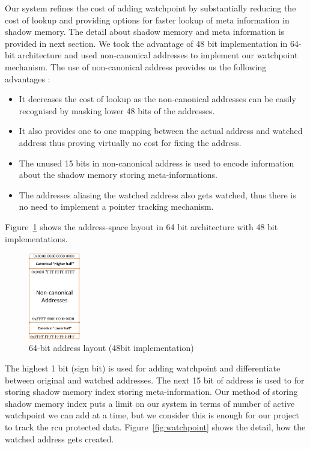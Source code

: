 Our system refines the cost of adding watchpoint by substantially reducing the cost of lookup and providing options for faster lookup of meta information in shadow memory. The detail about shadow memory and meta information is provided in next section. We took the advantage of 48 bit implementation in 64-bit architecture and used non-canonical addresses to implement our watchpoint mechanism. The use of non-canonical address provides us the following advantages :
\begin{itemize}
	\item It decreases the cost of lookup as the non-canonical addresses can be easily recognised by masking lower 48 bits of the addresses.
	\item It also provides one to one mapping between the actual address and watched address thus proving virtually no cost for fixing the address.
	\item The unused 15 bits in non-canonical address is used to encode information about the shadow memory storing meta-informations.
	\item The addresses aliasing the watched address also gets watched, thus there is no need to implement a pointer tracking mechanism.
\end{itemize}   

Figure~\ref{fig:addrspace} shows the address-space layout in 64 bit architecture with 48 bit implementations. 
\begin{figure}[h!]
\centering
 	\includegraphics[width=0.2\textwidth]{Picture3-png}
\caption{64-bit address layout (48bit implementation)}\label{fig:addrspace}
\end{figure}
The highest 1 bit (sign bit) is used for adding watchpoint and differentiate between original and watched addresses. The next 15 bit of address is used to for storing shadow memory index storing meta-information. Our method of storing shadow memory index puts a limit on our system in terms of number of active watchpoint we can add at a time, but we consider this is enough for our project to track the rcu protected data. Figure~\ref{fig:watchpoint} shows the detail, how the watched address gets created.

